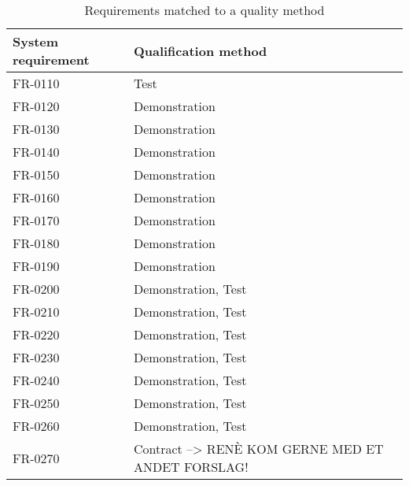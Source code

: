 \begin{table}[H]
\begin{tabular}{|l|l|}
\hline
 \textbf{System requirement} & \textbf{Qualification method} \\ \hline
 FR-0110 & Test \\  \hline
 FR-0120 & Demonstration \\  \hline
 FR-0130 & Demonstration \\  \hline
 FR-0140 & Demonstration \\  \hline
 FR-0150 & Demonstration \\  \hline
 FR-0160 & Demonstration \\  \hline
 FR-0170 & Demonstration  \\  \hline
 FR-0180 & Demonstration \\  \hline
 FR-0190 & Demonstration  \\  \hline
 FR-0200 & Demonstration, Test  \\  \hline
 FR-0210 & Demonstration, Test \\  \hline
 FR-0220 & Demonstration, Test \\  \hline
 FR-0230 & Demonstration, Test \\  \hline
 FR-0240 & Demonstration, Test \\  \hline
 FR-0250 & Demonstration, Test \\  \hline
 FR-0260 & Demonstration, Test \\  \hline               
 FR-0270 & Contract --> RENÈ KOM GERNE MED ET ANDET FORSLAG! \\  \hline
\end{tabular}
\caption{Requirements matched to a quality method}
\end{table}
